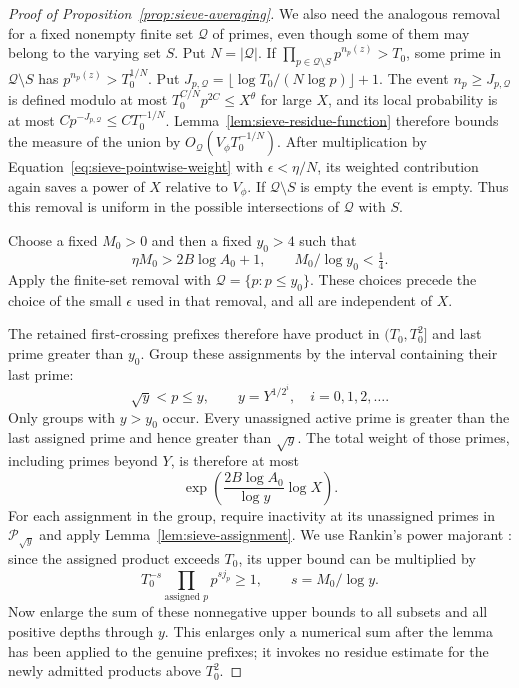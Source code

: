 \begin{proof}[Proof of Proposition~\ref{prop:sieve-averaging}]
We also need the analogous removal for a fixed nonempty finite set
$\mathcal Q$ of primes, even though some of them may belong to the varying
set $S$.  Put $N=|\mathcal Q|$.  If
$\prod_{p\in\mathcal Q\setminus S}p^{n_p(z)}>T_0$, some prime in
$\mathcal Q\setminus S$ has $p^{n_p(z)}>T_0^{1/N}$.  Put
$J_{p,\mathcal Q}=\lfloor\log T_0/(N\log p)\rfloor+1$.  The event
$n_p\ge J_{p,\mathcal Q}$ is defined modulo at most
$T_0^{C/N}p^{2C}\le X^\theta$ for large $X$, and its local probability
is at most $Cp^{-J_{p,\mathcal Q}}\le C T_0^{-1/N}$.
Lemma~\ref{lem:sieve-residue-function} therefore bounds the measure of
the union by
$O_{\mathcal Q}(V_\phi T_0^{-1/N})$.  After multiplication by
Equation~\eqref{eq:sieve-pointwise-weight} with $\epsilon<\eta/N$, its
weighted contribution again saves a power of $X$ relative to $V_\phi$.
If $\mathcal Q\setminus S$ is empty the event is empty.  Thus this
removal is uniform in the possible intersections of $\mathcal Q$ with $S$.

Choose a fixed $M_0>0$ and then a fixed $y_0>4$ such that
\begin{equation}\label{eq:sieve-crossing-parameters}
 \eta M_0>2B\log A_0+1,\qquad M_0/\log y_0<\tfrac14.
\end{equation}
Apply the finite-set removal with $\mathcal Q=\{p:p\le y_0\}$.
These choices precede the choice of the small $\epsilon$ used in that
removal, and all are independent of $X$.

The retained first-crossing prefixes therefore have product in
$(T_0,T_0^2]$ and last prime greater than $y_0$.  Group these assignments
by the interval containing their last prime:
\begin{equation}\label{eq:sieve-buckets}
 \sqrt y<p\le y,\qquad y=Y^{1/2^i},\quad i=0,1,2,\ldots.
\end{equation}
Only groups with $y>y_0$ occur.  Every unassigned active prime is greater
than the last assigned prime and hence greater than $\sqrt y$.  The total
weight of those primes, including primes beyond $Y$, is therefore at most
\begin{equation}\label{eq:sieve-unassigned}
 \exp\left(\frac{2B\log A_0}{\log y}\log X\right).
\end{equation}
For each assignment in the group, require inactivity at its unassigned
primes in $\mathcal P_{\sqrt y}$ and apply
Lemma~\ref{lem:sieve-assignment}.  We use Rankin's power majorant
\cite{Rankin1938}: since the assigned product exceeds $T_0$, its upper
bound can be multiplied by
\[
 T_0^{-s}\prod_{\text{assigned }p}p^{s j_p}\ge1,
 \qquad s=M_0/\log y.
\]
Now enlarge the sum of these nonnegative upper bounds to all subsets and
all positive depths through $y$.  This enlarges only a numerical sum after
the lemma has been applied to the genuine prefixes; it invokes no residue
estimate for the newly admitted products above $T_0^2$.


\end{proof}
